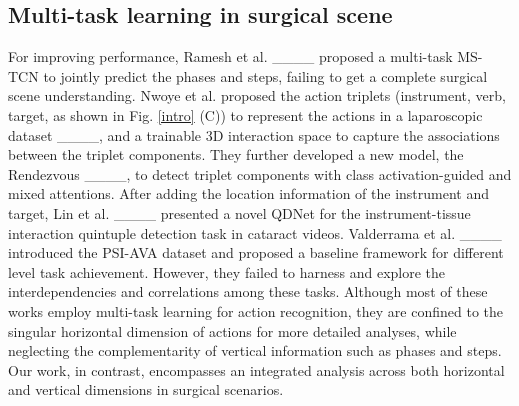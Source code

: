

\subsection{Multi-task learning in surgical scene}
For improving performance,  Ramesh et al. ____ proposed a multi-task MS-TCN to jointly predict the phases and steps, failing to get a complete surgical scene understanding.
Nwoye et al. proposed the action triplets (instrument, verb, target, as shown in Fig. \ref{intro} (C)) to represent the actions in a laparoscopic dataset ____, and a trainable 3D interaction space to capture the associations between the triplet components. They further developed a new model, the Rendezvous ____, to detect triplet components with class activation-guided and mixed attentions. After adding the location information of the instrument and target, Lin et al. ____ presented a novel QDNet for the instrument-tissue interaction quintuple detection task in cataract videos. Valderrama et al. ____ introduced the PSI-AVA dataset and proposed a baseline framework for different level task achievement. However, they failed to harness and explore the interdependencies and correlations among these tasks. Although most of these works employ multi-task learning for action recognition, they are confined to the singular horizontal dimension of actions for more detailed analyses, while neglecting the complementarity of vertical information such as phases and steps.  Our work, in contrast, encompasses an integrated analysis across both horizontal and vertical dimensions in surgical scenarios.